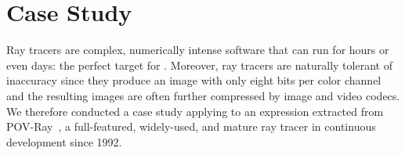 \documentclass[paper.tex]{subfiles}
\begin{document}
\section{Case Study}
\label{sec:case_study}

Ray tracers are complex, numerically intense software
  that can run for hours or even days:
  the perfect target for \name.
Moreover, ray tracers are naturally tolerant of inaccuracy
  since they produce an image with only eight bits per color channel
  and the resulting images are often further compressed by image and video codecs.
We therefore conducted a case study applying \name to an expression extracted
  from POV-Ray~\cite{povray},
  a full-featured, widely-used, and mature ray tracer
  in continuous development since 1992.
\end{document}
